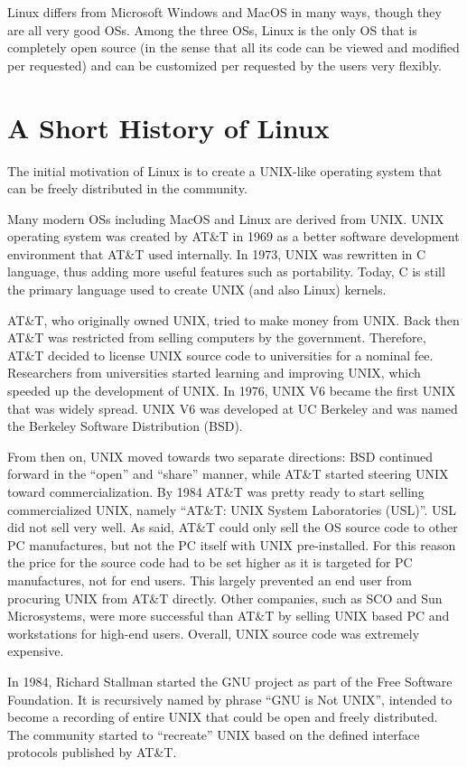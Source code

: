 Linux differs from Microsoft Windows and MacOS in many ways, though they are all very good OSs. Among the three OSs, Linux is the only OS that is completely open source (in the sense that all its code can be viewed and modified per requested) and can be customized per requested by the users very flexibly.

\section{A Short History of Linux}

The initial motivation of Linux is to create a UNIX-like operating system that can be freely distributed in the community.

Many modern OSs including MacOS and Linux are derived from UNIX. UNIX operating system was created by AT\&T in 1969 as a better software development environment that AT\&T used internally. In 1973, UNIX was rewritten in C language, thus adding more useful features such as portability. Today, C is still the primary language used to create UNIX (and also Linux) kernels.

AT\&T, who originally owned UNIX, tried to make money from UNIX. Back then AT\&T was restricted from selling computers by the government. Therefore, AT\&T decided to license UNIX source code to universities for a nominal fee. Researchers from universities started learning and improving UNIX, which speeded up the development of UNIX. In 1976, UNIX V6 became the first UNIX that was widely spread. UNIX V6 was developed at UC Berkeley and was named the Berkeley Software Distribution (BSD).

From then on, UNIX moved towards two separate directions: BSD continued forward in the ``open'' and ``share'' manner, while AT\&T started steering UNIX toward commercialization. By 1984 AT\&T was pretty ready to start selling commercialized UNIX, namely ``AT\&T: UNIX System Laboratories (USL)''. USL did not sell very well. As said, AT\&T could only sell the OS source code to other PC manufactures, but not the PC itself with UNIX pre-installed. For this reason the price for the source code had to be set higher as it is targeted for PC manufactures, not for end users. This largely prevented an end user from procuring UNIX from AT\&T directly. Other companies, such as SCO and Sun Microsystems, were more successful than AT\&T by selling UNIX based PC and workstations for high-end users. Overall, UNIX source code was extremely expensive.

In 1984, Richard Stallman started the GNU project as part of the Free Software Foundation. It is recursively named by phrase ``GNU is Not UNIX'', intended to become a recording of entire UNIX that could be open and freely distributed. The community started to ``recreate'' UNIX based on the defined interface protocols published by AT\&T.

